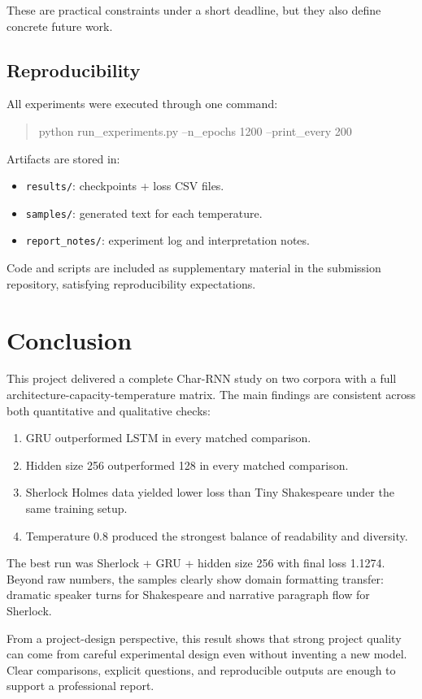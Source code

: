 \documentclass[10pt,twocolumn,letterpaper]{article}
\begin{document}
These are practical constraints under a short deadline, but they also define concrete future work.

\subsection{Reproducibility}
All experiments were executed through one command:
\begin{quote}\footnotesize\ttfamily
python run\_experiments.py --n\_epochs 1200 --print\_every 200
\end{quote}

Artifacts are stored in:
\begin{itemize}
\item \texttt{results/}: checkpoints + loss CSV files.
\item \texttt{samples/}: generated text for each temperature.
\item \texttt{report\_notes/}: experiment log and interpretation notes.
\end{itemize}

Code and scripts are included as supplementary material in the submission repository, satisfying reproducibility expectations.

\section{Conclusion}
This project delivered a complete Char-RNN study on two corpora with a full architecture-capacity-temperature matrix. The main findings are consistent across both quantitative and qualitative checks:
\begin{enumerate}
\item GRU outperformed LSTM in every matched comparison.
\item Hidden size 256 outperformed 128 in every matched comparison.
\item Sherlock Holmes data yielded lower loss than Tiny Shakespeare under the same training setup.
\item Temperature 0.8 produced the strongest balance of readability and diversity.
\end{enumerate}

The best run was Sherlock + GRU + hidden size 256 with final loss 1.1274. Beyond raw numbers, the samples clearly show domain formatting transfer: dramatic speaker turns for Shakespeare and narrative paragraph flow for Sherlock.

From a project-design perspective, this result shows that strong project quality can come from careful experimental design even without inventing a new model. Clear comparisons, explicit questions, and reproducible outputs are enough to support a professional report.
\end{document}
